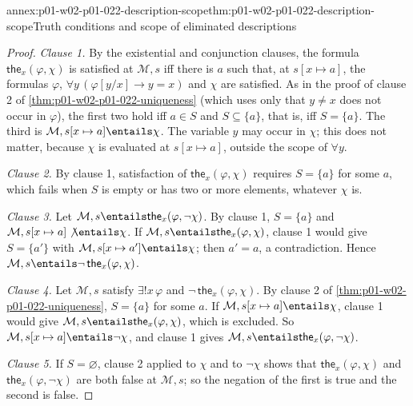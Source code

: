 \begin{annexitem}{annex:p01-w02-p01-022-description-scope}{thm:p01-w02-p01-022-description-scope}{Truth conditions and scope of eliminated descriptions}
\begin{proof}
\emph{Clause 1.} By the existential and conjunction clauses, the formula
\(\mathsf{the}_x(\varphi,\chi)\) is satisfied at \(\mathcal M,s\) iff there
is \(a\) such
that, at \(s[x\mapsto a]\), the formulas \(\varphi\),
\(\forall y\,(\varphi[y/x]\to y=x)\) and \(\chi\) are satisfied. As in the
proof of clause 2 of \cref{thm:p01-w02-p01-022-uniqueness} (which uses only
that \(y\ne x\) does not occur in \(\varphi\)), the first two hold iff
\(a\in S\) and \(S\subseteq\{a\}\), that is, iff \(S=\{a\}\). The third is
\(\mathcal M,s[x\mapsto a]\entails\chi\). The variable \(y\) may occur in
\(\chi\); this does not matter, because \(\chi\) is evaluated at
\(s[x\mapsto a]\), outside the scope of \(\forall y\).

\emph{Clause 2.} By clause 1, satisfaction of
\(\mathsf{the}_x(\varphi,\chi)\) requires \(S=\{a\}\) for some \(a\), which
fails when \(S\) is empty or has two or more elements, whatever \(\chi\) is.

\emph{Clause 3.} Let \(\mathcal M,s\entails\mathsf{the}_x(\varphi,\neg\chi)\).
By clause 1, \(S=\{a\}\) and \(\mathcal M,s[x\mapsto a]\not\entails\chi\).
If \(\mathcal M,s\entails\mathsf{the}_x(\varphi,\chi)\), clause 1 would give
\(S=\{a'\}\) with \(\mathcal M,s[x\mapsto a']\entails\chi\); then
\(a'=a\), a contradiction. Hence
\(\mathcal M,s\entails\neg\,\mathsf{the}_x(\varphi,\chi)\).

\emph{Clause 4.} Let \(\mathcal M,s\) satisfy \(\exists!x\,\varphi\) and
\(\neg\,\mathsf{the}_x(\varphi,\chi)\). By clause 2 of
\cref{thm:p01-w02-p01-022-uniqueness}, \(S=\{a\}\) for some \(a\). If
\(\mathcal M,s[x\mapsto a]\entails\chi\), clause 1 would give
\(\mathcal M,s\entails\mathsf{the}_x(\varphi,\chi)\), which is excluded. So
\(\mathcal M,s[x\mapsto a]\entails\neg\chi\), and clause 1 gives
\(\mathcal M,s\entails\mathsf{the}_x(\varphi,\neg\chi)\).

\emph{Clause 5.} If \(S=\varnothing\), clause 2 applied to \(\chi\) and to
\(\neg\chi\) shows that \(\mathsf{the}_x(\varphi,\chi)\) and
\(\mathsf{the}_x(\varphi,\neg\chi)\) are both false at \(\mathcal M,s\); so
the negation of the first is true and the second is false.
\end{proof}
\end{annexitem}

